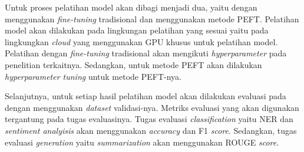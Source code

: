 Untuk proses pelatihan model akan dibagi menjadi dua, yaitu dengan menggunakan \textit{fine-tuning} tradisional dan menggunakan metode PEFT. Pelatihan model akan dilakukan pada lingkungan pelatihan yang sesuai yaitu pada lingkungkan \textit{cloud} yang menggunakan GPU khusus untuk pelatihan model. Pelatihan dengan \textit{fine-tuning} tradisional akan mengikuti \textit{hyperparameter} pada penelitian terkaitnya. Sedangkan, untuk metode PEFT akan dilakukan \textit{hyperparameter tuning} untuk metode PEFT-nya.

Selanjutnya, untuk setiap hasil pelatihan model akan dilakukan evaluasi pada dengan menggunakan \textit{dataset} validasi-nya. Metriks evaluasi yang akan digunakan tergantung pada tugas evaluasinya. Tugas evaluasi \textit{classification} yaitu NER dan \textit{sentiment analyisis} akan menggunakan \textit{accuracy} dan F1 \textit{score}. Sedangkan, tugas evaluasi \textit{generation} yaitu \textit{summarization} akan menggunakan ROUGE \textit{score}.

